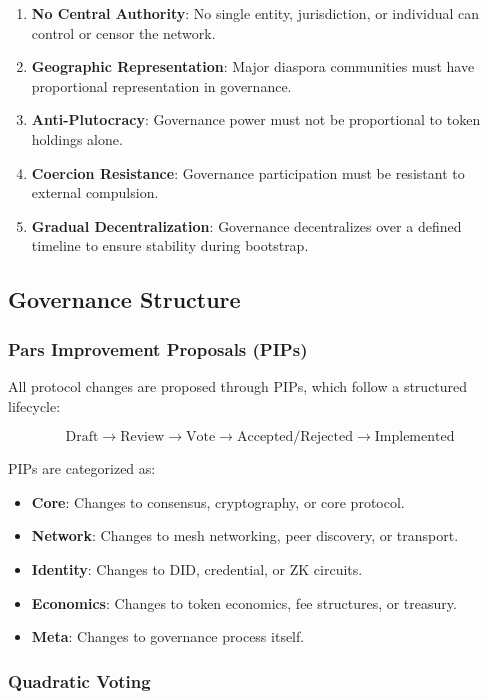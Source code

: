 \documentclass[11pt,a4paper,twocolumn]{article}
\begin{document}
\begin{enumerate}[leftmargin=*]
  \item \textbf{No Central Authority}: No single entity, jurisdiction, or individual can control or censor the network.
  \item \textbf{Geographic Representation}: Major diaspora communities must have proportional representation in governance.
  \item \textbf{Anti-Plutocracy}: Governance power must not be proportional to token holdings alone.
  \item \textbf{Coercion Resistance}: Governance participation must be resistant to external compulsion.
  \item \textbf{Gradual Decentralization}: Governance decentralizes over a defined timeline to ensure stability during bootstrap.
\end{enumerate}

\subsection{Governance Structure}

\subsubsection{Pars Improvement Proposals (PIPs)}

All protocol changes are proposed through PIPs, which follow a structured lifecycle:

$$\text{Draft} \to \text{Review} \to \text{Vote} \to \text{Accepted/Rejected} \to \text{Implemented}$$

PIPs are categorized as:
\begin{itemize}
  \item \textbf{Core}: Changes to consensus, cryptography, or core protocol.
  \item \textbf{Network}: Changes to mesh networking, peer discovery, or transport.
  \item \textbf{Identity}: Changes to DID, credential, or ZK circuits.
  \item \textbf{Economics}: Changes to token economics, fee structures, or treasury.
  \item \textbf{Meta}: Changes to governance process itself.
\end{itemize}

\subsubsection{Quadratic Voting}
\end{document}
